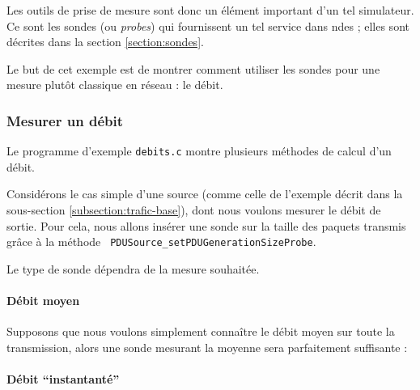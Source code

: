    Les outils de prise de mesure sont donc un élément important d'un
tel simulateur. Ce sont les sondes (ou {\em probes}) qui fournissent
un tel service dans {\sc ndes} ; elles sont décrites dans la section
\ref{section:sondes}.

   Le but de cet exemple est de montrer comment utiliser les sondes
pour une mesure plutôt classique en réseau : le débit.

\subsubsection{Mesurer un débit}

   Le programme d'exemple {\tt debits.c} montre plusieurs méthodes de
calcul d'un débit.

   Considérons le cas simple d'une source (comme celle de l'exemple
décrit dans la sous-section \ref{subsection:trafic-base}), dont nous
voulons mesurer le débit de sortie. Pour cela, nous allons insérer une
sonde sur la taille des paquets transmis grâce à la méthode {\tt
  PDUSource\_setPDUGenerationSizeProbe}.

   Le type de sonde dépendra de la mesure souhaitée.

%
\paragraph{Débit moyen}

   Supposons que nous voulons simplement connaître le débit moyen sur
toute la transmission, alors une sonde mesurant la moyenne sera parfaitement
suffisante :

%
\paragraph{Débit ``instantanté''}

